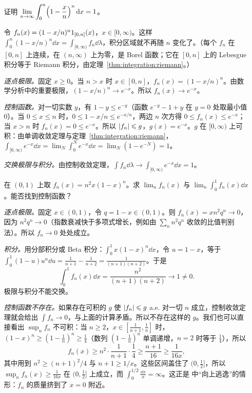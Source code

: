 \begin{workedexample}\label{we:integration:exp-limit}
证明 $\displaystyle\lim_{n\to\infty}\int_0^n\Bigl(1-\frac xn\Bigr)^n\,\mathrm{d} x=1$。
\end{workedexample}
\begin{solution}
令 $f_n(x)=(1-x/n)^n1_{[0,n]}(x)$，$x\in[0,\infty)$。这样 $\int_0^n(1-x/n)^n\dd x=\int_{[0,\infty)}f_n\dd\lambda$，积分区域就不再随 $n$ 变化了。（每个 $f_n$ 在 $[0,n]$ 上连续，在 $(n,\infty)$ 上为零，是 Borel 函数；它在 $[0,n]$ 上的 Lebesgue 积分等于 Riemann 积分，由定理~\ref{thm:integration:riemann}。）

\emph{逐点极限。}固定 $x\geqslant0$。当 $n>x$ 时 $x\in[0,n]$，$f_n(x)=(1-x/n)^n$。由数学分析中的重要极限，$(1-x/n)^n\to e^{-x}$。所以 $f_n(x)\to e^{-x}$。

\emph{控制函数。}对一切实数 $y$，有 $1-y\leqslant e^{-y}$（函数 $e^{-y}-1+y$ 在 $y=0$ 处取最小值 $0$）。当 $0\leqslant x\leqslant n$ 时，$0\leqslant1-x/n\leqslant e^{-x/n}$，两边 $n$ 次方得 $0\leqslant f_n(x)\leqslant e^{-x}$；当 $x>n$ 时 $f_n(x)=0\leqslant e^{-x}$。所以 $\lvert f_n\rvert\leqslant g$，$g(x)=e^{-x}$。$g$ 在 $[0,\infty)$ 上可积：由单调收敛定理与定理~\ref{thm:integration:riemann}，$\int_{[0,\infty)}e^{-x}\dd x=\lim_{N}\int_0^Ne^{-x}\dd x=\lim_N(1-e^{-N})=1$。

\emph{交换极限与积分。}由控制收敛定理，$\int f_n\dd\lambda\to\int_{[0,\infty)}e^{-x}\dd x=1$。
\end{solution}

\begin{workedexample}\label{we:integration:dct-fails}
在 $(0,1)$ 上取 $f_n(x)=n^2x(1-x)^n$。求 $\lim_nf_n(x)$ 与 $\lim_n\int_0^1f_n(x)\dd x$。能否找到控制函数？
\end{workedexample}
\begin{solution}
\emph{逐点极限。}固定 $x\in(0,1)$，令 $q=1-x\in(0,1)$。则 $f_n(x)=xn^2q^n\to0$，因为 $n^2q^n\to0$（指数衰减快于多项式增长，例如由 $\sum_nn^2q^n$ 收敛的比值判别法）。所以 $f_n\to0$ 处处成立。

\emph{积分。}用分部积分或 Beta 积分：$\int_0^1x(1-x)^n\dd x$，令 $u=1-x$，等于 $\int_0^1(1-u)u^n\dd u=\frac1{n+1}-\frac1{n+2}=\frac1{(n+1)(n+2)}$。于是
\[
\int_0^1f_n(x)\dd x=\frac{n^2}{(n+1)(n+2)}\to1\neq0 .
\]
极限与积分不能交换。

\emph{控制函数不存在。}如果存在可积的 $g$ 使 $\lvert f_n\rvert\leqslant g$ a.e. 对一切 $n$ 成立，控制收敛定理就会给出 $\int f_n\to0$，与上面的计算矛盾。所以不存在这样的 $g$。我们也可以直接看出 $\sup_nf_n$ 不可积：当 $n\geqslant2$，$x\in[\frac1{n+1},\frac1n]$ 时，$(1-x)^n\geqslant(1-\frac1n)^n\geqslant\frac14$（数列 $(1-\frac1n)^n$ 单调递增，$n=2$ 时等于 $\frac14$），所以
\[
f_n(x)\geqslant n^2\cdot\frac1{n+1}\cdot\frac14\geqslant\frac{n+1}{16}\geqslant\frac1{16x},
\]
其中用到 $n^2\geqslant(n+1)^2/4$ 与 $n+1\geqslant1/x$。这些区间盖住了 $(0,\frac12]$，所以 $\sup_nf_n(x)\geqslant\frac1{16x}$ 在 $(0,\frac12]$ 上成立，而 $\int_0^{1/2}\frac{\dd x}x=\infty$。这正是 中“向上逃逸”的情形：$f_n$ 的质量挤到了 $x=0$ 附近。
\end{solution}

